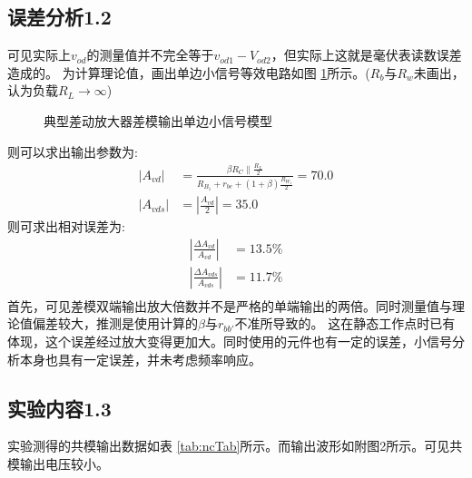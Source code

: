 \documentclass[a4paper,11pt,UTF8]{ctexart}
\begin{document}
	\subsection{误差分析1.2}
	可见实际上$v_{od}$的测量值并不完全等于$v_{od1}-V_{od2}$，但实际上这就是毫伏表读数误差造成的。
	为计算理论值，画出单边小信号等效电路如图 \ref{fig:ndSmallSignal}所示。($R_b$与$R_w$未画出，认为负载$R_L\rightarrow\infty$)
	\begin{figure}[htbp]
		\centering
		\caption{典型差动放大器差模输出单边小信号模型}
		\label{fig:ndSmallSignal}
	\end{figure}
	则可以求出输出参数为:
	\begin{equation}
		\begin{aligned}
			\left | A_{vd}\right |&=\frac{\beta R_C\parallel\frac{R_L}{2}}{R_{B_1}+r_{be}+(1+\beta)\frac{R_{W_1}}{2}}=70.0\\
			\left | A_{vds}\right |&=\left |\frac{A_{vd}}{2}\right |=35.0
		\end{aligned}
	\end{equation}
	则可求出相对误差为:
	\begin{equation}
		\begin{aligned}
			\left |\frac{\Delta A_{vd}}{A_{vd}}\right |&=13.5\%\\
			\left |\frac{\Delta A_{vds}}{A_{vds}}\right |&=11.7\%\\
		\end{aligned}
	\end{equation}
	首先，可见差模双端输出放大倍数并不是严格的单端输出的两倍。同时测量值与理论值偏差较大，推测是使用计算的$\beta$与$r_{bb'}$不准所导致的。
	这在静态工作点时已有体现，这个误差经过放大变得更加大。同时使用的元件也有一定的误差，小信号分析本身也具有一定误差，并未考虑频率响应。
	\subsection{实验内容1.3}
	实验测得的共模输出数据如表 \ref{tab:ncTab}所示。而输出波形如附图2所示。可见共模输出电压较小。
	
\end{document}
